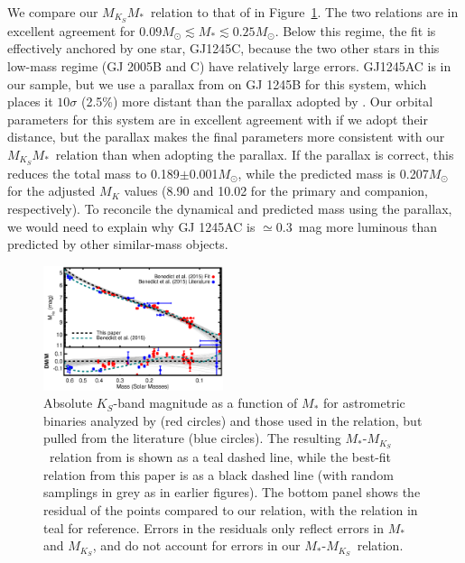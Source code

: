 \documentclass[twocolumn]{aastex62}
\newcommand{\mks}{$M_{K_S}$}
\newcommand{\mmk}{$M_{K_S}$\textendash$M_*$}
\begin{document}
We compare our \mmk\ relation to that of \citet{Benedict2016} in Figure~\ref{fig:benedict}. The two relations are in excellent agreement for $0.09M_\odot\lesssim M_* \lesssim 0.25M_\odot$. Below this regime, the \citet{Benedict2016} fit is effectively anchored by one star, GJ1245C, because the two other stars in this low-mass regime (GJ 2005B and C) have relatively large errors. GJ1245AC is in our sample, but we use a parallax from \citet{GaiaDr2} on GJ 1245B for this system, which places it $10\sigma$ (2.5\%) more distant than the parallax adopted by \citet{Benedict2016}. Our orbital parameters for this system are in excellent agreement with \citet{Benedict2016} if we adopt their distance, but the \citet{GaiaDr2} parallax makes the final parameters more consistent with our \mmk\ relation than when adopting the \citet{Benedict2016} parallax. If the \citet{Benedict2016} parallax is correct, this reduces the total mass to 0.189$\pm$0.001$M_\odot$, while the predicted mass is 0.207$M_\odot$ for the adjusted $M_K$ values (8.90 and 10.02 for the primary and companion, respectively). To reconcile the dynamical and predicted mass using the \citet{Benedict2016} parallax, we would need to explain why GJ 1245AC is $\simeq$0.3~mag more luminous than predicted by other similar-mass objects.


\begin{figure}[htb]
\begin{center}
\includegraphics[width=0.47\textwidth]{Benedict_comp.eps}
\caption{Absolute $K_S$-band magnitude as a function of $M_*$ for astrometric binaries analyzed by \citet{Benedict2016} (red circles) and those used in the \citet{Benedict2016} relation, but pulled from the literature (blue circles). The resulting $M_*$-\mks\ relation from \citet{Benedict2016} is shown as a teal dashed line, while the best-fit relation from this paper is as a black dashed line (with random samplings in grey as in earlier figures). The bottom panel shows the residual of the \citet{Benedict2016} points compared to our relation, with the \citet{Benedict2016} relation in teal for reference. Errors in the residuals only reflect errors in $M_*$ and \mks, and do not account for errors in our $M_*$-\mks\ relation. }
\label{fig:benedict}
\end{center}
\end{figure}
\end{document}
